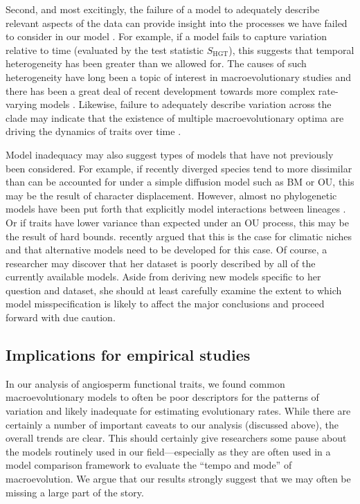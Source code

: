 Second, and most excitingly, the failure of a model to adequately describe relevant aspects of the data can provide insight into the processes we have failed to consider in our model \citep{Gelman2012}. For example, if a model fails to capture variation relative to time (evaluated by the test statistic $S_{\text{HGT}}$), this suggests that temporal heterogeneity has been greater than we allowed for. The causes of such heterogeneity have long been a topic of interest in macroevolutionary studies \citep[e.g.,][]{Simpson1944, Foote1997} and there has been a great deal of recent development towards more complex rate-varying models \citep[e.g.,][]{Omeara2006, Thomas2006, Eastman2011, Weir2012, RaboskyBAMM}. Likewise, failure to adequately describe variation across the clade may indicate that the existence of multiple macroevolutionary optima \citep[sensu][]{Hansen2012book} are driving the dynamics of traits over time \citep[see][for models that have been used to capture these dynamics]{Hansen1997, ButlerKing2004, Beaulieu2012, IngramMahler2013, UyedaBayou}. 

Model inadequacy may also suggest types of models that have not previously been considered. For example, if recently diverged species tend to more dissimilar than can be accounted for under a simple diffusion model such as BM or OU, this may be the result of character displacement. However, almost no phylogenetic models have been put forth that explicitly model interactions between lineages \citep[but see][]{NuismerHarmon}. Or if traits have lower variance than expected under an OU process, this may be the result of hard bounds. \citet{Davies2014} recently argued that this is the case for climatic niches and that alternative models need to be developed for this case. Of course, a researcher may discover that her dataset is poorly described by all of the currently available models. Aside from deriving new models specific to her question and dataset, she should at least carefully examine the extent to which model misspecification is likely to affect the major conclusions and proceed forward with due caution.
 
\subsection{Implications for empirical studies}

In our analysis of angiosperm functional traits, we found common macroevolutionary models to often be poor descriptors for the patterns of variation and likely inadequate for estimating evolutionary rates. While there are certainly a number of important caveats to our analysis (discussed above), the overall trends are clear. This should certainly give researchers some pause about the models routinely used in our field---especially as they are often used in a model comparison framework to evaluate the ``tempo and mode'' of macroevolution. We argue that our results strongly suggest that we may often be missing a large part of the story.

